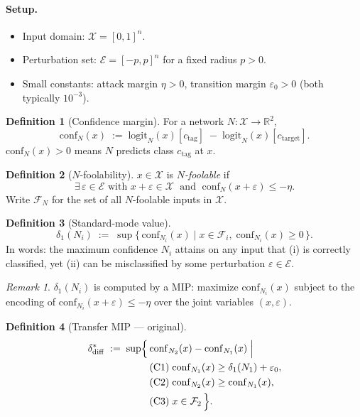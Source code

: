 \documentclass[12pt]{article}
\theoremstyle{definition}
\newtheorem{definition}{Definition}[section]
\theoremstyle{plain}
\theoremstyle{remark}
\newtheorem{remark}{Remark}[section]
\newcommand{\conf}[2]{\mathrm{conf}_{#1}(#2)}
\newcommand{\dN}[1]{\delta_1(N_{#1})}
\newcommand{\ddiff}{\delta_{\mathrm{diff}}^{*}}
\newcommand{\Xdom}{\mathcal{X}}
\newcommand{\Edom}{\mathcal{E}}
\newcommand{\Ffool}[1]{\mathcal{F}_{#1}}
\newcommand{\R}{\mathbb{R}}
\begin{document}
\paragraph{Setup.}
\begin{itemize}
  \item Input domain: $\Xdom=[0,1]^n$.
  \item Perturbation set: $\Edom=[-p,p]^n$ for a fixed radius $p>0$.
  \item Small constants: attack margin $\eta>0$, transition margin
        $\varepsilon_0>0$ (both typically $10^{-3}$).
\end{itemize}

\begin{definition}[Confidence margin]\label{def:conf}
For a network $N:\Xdom\to\R^2$,
\[
  \conf{N}{x}
  \;:=\;
  \mathrm{logit}_N(x)[c_\mathrm{tag}]
  \;-\;
  \mathrm{logit}_N(x)[c_\mathrm{target}].
\]
$\conf{N}{x}>0$ means $N$ predicts class $c_\mathrm{tag}$ at $x$.
\end{definition}

\begin{definition}[$N$-foolability]\label{def:foolable}
$x\in\Xdom$ is \emph{$N$-foolable} if
\[
  \exists\,\varepsilon\in\Edom \text{ with }
  x+\varepsilon\in\Xdom
  \;\text{ and }\;
  \conf{N}{x+\varepsilon}\leq -\eta.
\]
Write $\Ffool{N}$ for the set of all $N$-foolable inputs in $\Xdom$.
\end{definition}

\begin{definition}[Standard-mode value]\label{def:delta1}
\[
  \dN{i}
  \;:=\;
  \sup\bigl\{\,\conf{N_i}{x}
    \;\big|\;
    x\in\Ffool{i},\;
    \conf{N_i}{x}\geq 0
  \,\bigr\}.
\]
In words: the maximum confidence $N_i$ attains on any input that
(i) is correctly classified, yet (ii) can be misclassified by some
perturbation $\varepsilon\in\Edom$.
\end{definition}

\begin{remark}
$\dN{i}$ is computed by a MIP:
maximize $\conf{N_i}{x}$ subject to the encoding of
$\conf{N_i}{x+\varepsilon}\leq-\eta$ over the joint variables
$(x,\varepsilon)$.
\end{remark}

\begin{definition}[Transfer MIP — original]\label{def:ddiff}
\begin{align}
  \ddiff
  \;:=\;\sup\Bigl\{\,
    &\conf{N_2}{x}-\conf{N_1}{x}
    \;\Big|\notag\\
    &(\mathrm{C1})\;\conf{N_1}{x}\geq\dN{1}+\varepsilon_0,\notag\\
    &(\mathrm{C2})\;\conf{N_2}{x}\geq\conf{N_1}{x},\notag\\
    &(\mathrm{C3})\;x\in\Ffool{2}
  \,\Bigr\}.\label{eq:ddiff}
\end{align}
\end{definition}
\end{document}
